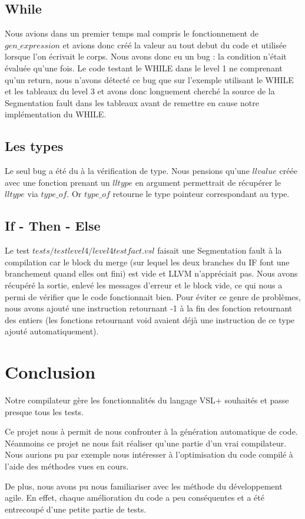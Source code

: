 \documentclass[10pt,a4paper]{article}
\begin{document}
\subsection{While}

Nous avions dans un premier temps mal compris le fonctionnement de $gen\_expression$ et avions donc cr\'e\'e la valeur au tout debut du code et utilis\'ee lorsque l'on \'ecrivait le corps. Nous avons donc eu un bug : la condition n'\'etait \'evalu\'ee qu'une fois. Le code testant le WHILE dans le level 1 ne comprenant qu'un return, nous n'avons d\'etect\'e ce bug que sur l'exemple utilisant le WHILE et les tableaux du level 3 et avons donc longuement cherch\'e la source de la Segmentation fault dans les tableaux avant de remettre en cause notre impl\'ementation du WHILE. 

\subsection{Les types} 

Le seul bug a \'et\'e du \`a la v\'erification de type. Nous pensions qu'une $llvalue$ cr\'e\'ee avec une fonction prenant un $lltype$ en argument permettrait de r\'ecup\'erer le $lltype$ via $type\_of$. Or $type\_of$ retourne le type pointeur correspondant au type.

\subsection{If - Then - Else}

Le test $tests/testlevel4/level4testfact.vsl$ faisait une Segmentation fault \`a la compilation car le block du merge (sur lequel les deux branches du IF font une branchement quand elles ont fini) est vide et LLVM n'appr\'eciait pas. Nous avons r\'ecup\'er\'e la sortie, enlev\'e les messages d'erreur et le block vide, ce qui nous a permi de v\'erifier que le code fonctionnait bien. Pour \'eviter ce genre de probl\`emes, nous avons ajout\'e une instruction retournant -1 \`a la fin des fonction retournant des entiers (les fonctions retournant void avaient d\'ej\`a une instruction de ce type ajout\'e automatiquement).

\section{Conclusion}

Notre compilateur gère les fonctionnalités du langage VSL+ souhaités et passe presque tous les tests.

Ce projet nous à permit de nous confronter à la génération automatique de code. 
Néanmoins ce projet ne nous fait réaliser qu'une partie d'un vrai compilateur. Nous aurions pu par exemple nous intéresser à l'optimisation du code compilé à l'aide des méthodes vues en cours.

De plus, nous avons pu nous familiariser avec les méthode du développement agile. En effet, chaque amélioration du code a peu conséquentes et a été entrecoupé d'une petite partie de tests.
\end{document}

